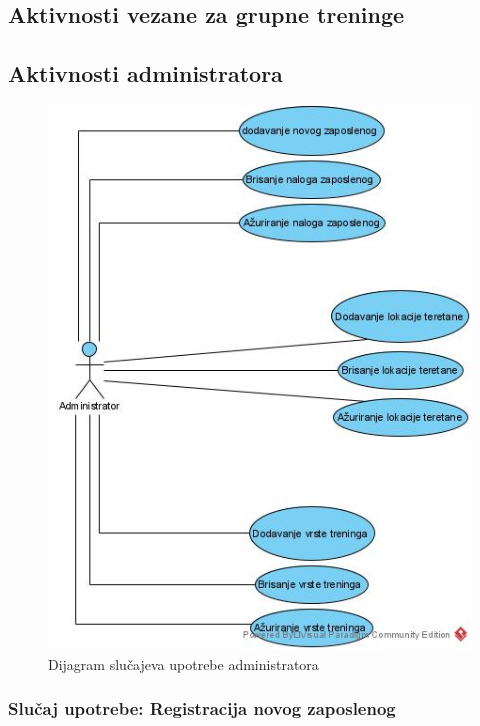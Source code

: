 \documentclass[a4paper]{article}
\begin{document}
\newpage
\subsection{Aktivnosti vezane za grupne treninge}


\newpage
\subsection{Aktivnosti administratora}

\begin{figure}[!ht]
\begin{center}
\includegraphics[scale=0.55]{sections/images/dijagram_slucajeva_upotrebe_administratora.jpg}
\end{center}
\caption{Dijagram slučajeva upotrebe administratora}
\label{fig:kontekst}
\end{figure}

\subsubsection{Slučaj upotrebe: Registracija novog zaposlenog}

\end{document}
